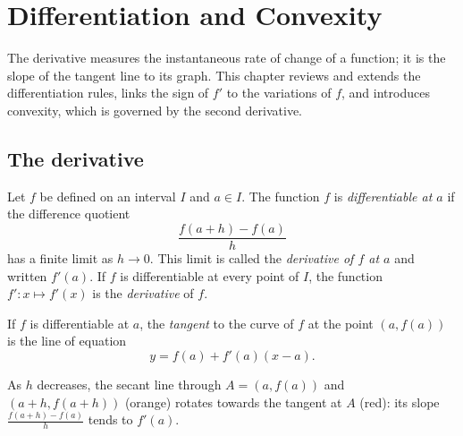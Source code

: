 \chapter{Differentiation and Convexity}\label{ch:tle:deriv}

The derivative measures the instantaneous rate of change of a function; it is
the slope of the tangent line to its graph. This chapter reviews and extends
the differentiation rules, links the sign of $f'$ to the variations of $f$,
and introduces convexity, which is governed by the second derivative.

\section{The derivative}

\begin{definition}\label{def:tle:deriv:derivative}
Let $f$ be defined on an interval $I$ and $a \in I$. The function $f$ is
\emph{differentiable at $a$} if the difference quotient
\[
\frac{f(a+h) - f(a)}{h}
\]
has a finite limit as $h \to 0$. This limit is called the \emph{derivative of
$f$ at $a$} and written $f'(a)$. If $f$ is differentiable at every point of
$I$, the function $f' \colon x \mapsto f'(x)$ is the \emph{derivative} of
$f$.
\end{definition}

\begin{definition}\label{def:tle:deriv:tangent}
If $f$ is differentiable at $a$, the \emph{tangent} to the
curve of $f$ at the point $(a, f(a))$ is the line of equation
\[
y = f(a) + f'(a)(x - a).
\]
\end{definition}

\begin{omfigure}

{\small As $h$ decreases, the secant line through $A = (a, f(a))$ and
$(a+h, f(a+h))$ (orange) rotates towards the tangent at $A$ (red): its
slope $\frac{f(a+h)-f(a)}{h}$ tends to $f'(a)$.}
\end{omfigure}

